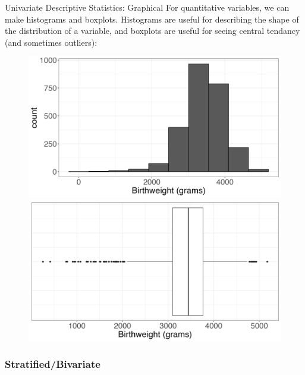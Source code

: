 \documentclass[10pt,t]{beamer}
\begin{document}
\begin{frame}{Univariate Descriptive Statistics: Graphical}
For quantitative variables, we can make histograms and boxplots. Histograms are useful for describing the shape of the distribution of a variable, and boxplots are useful for seeing central tendancy (and sometimes outliers):

\vspace{0.4cm}

\begin{figure}
	\centering
	\includegraphics[scale=0.2]{fs_hist.png}
	\hspace{0.2cm}
	\includegraphics[scale=0.2]{fs_box.png}
\end{figure}

\end{frame}

\subsubsection{Stratified/Bivariate}
\end{document}
